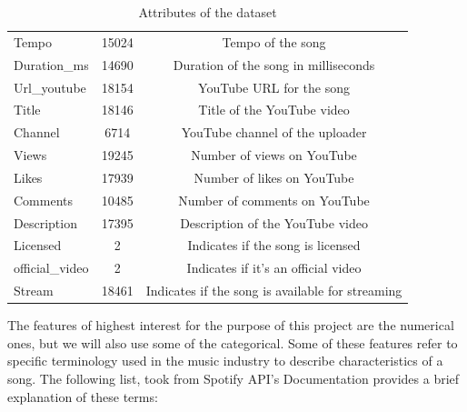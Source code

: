 \documentclass[11pt]{article} %
\begin{document}
\begin{table}[H]
\begin{tabular}{lcc}
		Tempo              & 15024                  & Tempo of the song                                \\
		Duration\_ms       & 14690                  & Duration of the song in milliseconds             \\
		Url\_youtube       & 18154                  & YouTube URL for the song                         \\
		Title              & 18146                  & Title of the YouTube video                       \\
		Channel            & 6714                   & YouTube channel of the uploader                  \\
		Views              & 19245                  & Number of views on YouTube                       \\
		Likes              & 17939                  & Number of likes on YouTube                       \\
		Comments           & 10485                  & Number of comments on YouTube                    \\
		Description        & 17395                  & Description of the YouTube video                 \\
		Licensed           & 2                      & Indicates if the song is licensed                \\
		official\_video    & 2                      & Indicates if it's an official video              \\
		Stream             & 18461                  & Indicates if the song is available for streaming \\
		\bottomrule
	\end{tabular}
	\caption{Attributes of the dataset}
	\label{tab:attributes}
\end{table}

The features of highest interest for the purpose of this project are the numerical ones, but we will also use some of the categorical.
Some of these features refer to specific terminology used in the music industry to describe characteristics of a song.
The following list, took from Spotify API's Documentation \cite{spotifyApi} provides a brief explanation of these terms:
\end{document}
